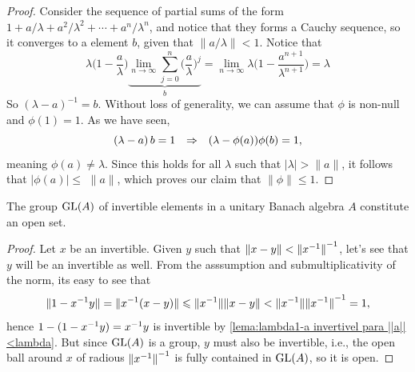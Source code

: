 \begin{lema}
\label{lema:lambda1-a invertivel para ||a||<lambda}
\end{lema}
\begin{proof}
   Consider the sequence of partial sums of the form $1+a / \lambda+a^{2} / \lambda^{2}+\cdots+a^{n} / \lambda^{n}$, and notice that they forms a Cauchy sequence, so it converges to a element $b$, given that $\|a / \lambda\|<1$. Notice that
$$
\lambda\Big(1-\frac{a}{\lambda}\Big) \underbrace{\lim _{n \rightarrow \infty} \sum_{j=0}^{n}\Big(\frac{a }{\lambda}\Big)^{j}}_{b}=\lim _{n \rightarrow \infty} \lambda\Big(1-\frac{a^{n+1}}{\lambda^{n+1}}\Big)=\lambda
$$
So $\left(\lambda-a\right)^{-1}=b$. Without loss of generality, we can assume that $\phi$ is non-null and $\phi\left(1\right)=1$. As we have seen,
$$
\left(\lambda-a\right) b=1 \hspace{0.25cm}\Rightarrow\hspace{0.25cm}(\lambda-\phi(a)) \phi(b)=1,
$$
meaning $\phi(a) \neq \lambda$. Since this holds for all $\lambda$ such that $|\lambda|>\|a\|$, it follows that $|\phi(a)| \leqslant$ $\|a\|$, which proves our claim that $\|\phi\|\leqslant 1$.
\end{proof}

\begin{proposicao}
\label{prop: GL(A) eh aberto}
The group $\operatorname{GL}(A)$ of invertible elements in a unitary Banach algebra $A$ constitute an open set.
\end{proposicao}
\begin{proof}
Let $x$ be an invertible. Given $y$ such that $\|x-y\| < {\|{x}^{-1}\|}^{-1}$, let's see that $y$ will be an invertible as well. From the asssumption and submultiplicativity of the norm, its easy to see that
\begin{equation*}
    \|1-{x}^{-1}y\|=\|{x}^{-1}(x-y)\| \leqslant \|{x}^{-1}\|\|x-y\| <\|{x}^{-1}\| {\|{x}^{-1}\|}^{-1} = 1,
\end{equation*}
hence $1-(1-{x}^{-1}y) = {x}^{-1}y$ is invertible by \ref{lema:lambda1-a invertivel para ||a||<lambda}. But since $\operatorname{GL}(A)$ is a group, $y$ must also be invertible, i.e., the open ball around $x$ of radious ${\|{x}^{-1}\|}^{-1}$ is fully contained in $\operatorname{GL}(A)$, so it is open.
\end{proof}

